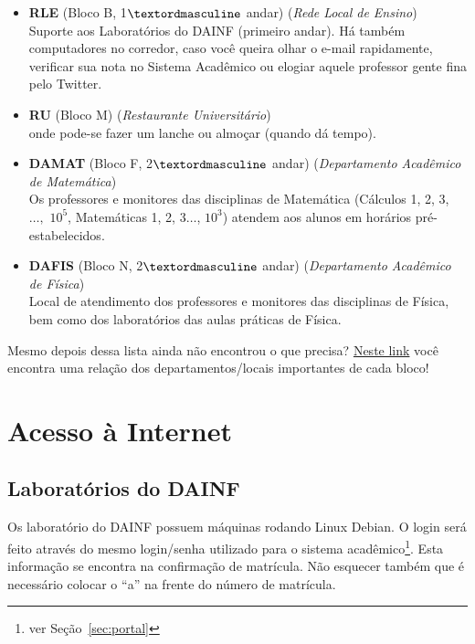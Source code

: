 \documentclass[a4paper,12pt,openany]{article}
\begin{document}
\begin{itemize}
\item \textbf{RLE} (Bloco B, 1$\textordmasculine$ andar) (\textit{Rede Local de Ensino}) \\Suporte aos Laboratórios do DAINF (primeiro andar). Há também computadores no corredor, caso você queira olhar o e-mail rapidamente, verificar sua nota no Sistema Acadêmico ou elogiar aquele professor gente fina pelo Twitter.

\item \textbf{RU} (Bloco M) (\textit{Restaurante Universitário})\\ onde pode-se fazer um lanche ou almoçar (quando dá tempo).

\item \textbf{DAMAT} (Bloco F, 2$\textordmasculine$ andar) (\textit{Departamento Acadêmico de Matemática})\\ Os professores e monitores das disciplinas de Matemática (Cálculos 1, 2, 3, $\ldots,$ $10^5$, Matemáticas 1, 2, 3$\ldots$, $10^3$) atendem aos alunos em horários pré-estabelecidos.

\item \textbf{DAFIS} (Bloco N, 2$\textordmasculine$ andar) (\textit{Departamento Acadêmico de Física})\\  Local de atendimento dos professores e monitores das disciplinas de Física, bem como dos laboratórios das aulas práticas de Física.

\end{itemize}

Mesmo depois dessa lista ainda não encontrou o que precisa? \href{http://200.134.25.110/mapa/mapa.html}{Neste link} você encontra uma relação dos departamentos/locais importantes de cada bloco!


\newpage
\section{Acesso à Internet}

\subsection{Laboratórios do DAINF}

Os laboratório do DAINF possuem máquinas rodando Linux Debian. O login será feito através do mesmo login/senha utilizado para o sistema acadêmico\footnote{ver Seção~\ref{sec:portal}}. Esta informação se encontra na confirmação de matrícula. Não esquecer também que é necessário colocar o ``a'' na frente do número de matrícula.
\end{document}
